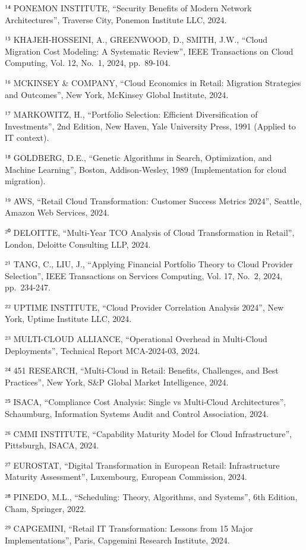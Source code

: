 \documentclass[12pt,a4paper,oneside]{book}
\numberwithin{figure}{chapter} %
\numberwithin{table}{chapter}  %
\begin{document}
¹⁴ PONEMON INSTITUTE, ``Security Benefits of Modern Network
Architectures'', Traverse City, Ponemon Institute LLC, 2024.

¹⁵ KHAJEH-HOSSEINI, A., GREENWOOD, D., SMITH, J.W., ``Cloud Migration
Cost Modeling: A Systematic Review'', IEEE Transactions on Cloud
Computing, Vol. 12, No.~1, 2024, pp.~89-104.

¹⁶ MCKINSEY \& COMPANY, ``Cloud Economics in Retail: Migration
Strategies and Outcomes'', New York, McKinsey Global Institute, 2024.

¹⁷ MARKOWITZ, H., ``Portfolio Selection: Efficient Diversification of
Investments'', 2nd Edition, New Haven, Yale University Press, 1991
(Applied to IT context).

¹⁸ GOLDBERG, D.E., ``Genetic Algorithms in Search, Optimization, and
Machine Learning'', Boston, Addison-Wesley, 1989 (Implementation for
cloud migration).

¹⁹ AWS, ``Retail Cloud Transformation: Customer Success Metrics 2024'',
Seattle, Amazon Web Services, 2024.

²⁰ DELOITTE, ``Multi-Year TCO Analysis of Cloud Transformation in
Retail'', London, Deloitte Consulting LLP, 2024.

²¹ TANG, C., LIU, J., ``Applying Financial Portfolio Theory to Cloud
Provider Selection'', IEEE Transactions on Services Computing, Vol. 17,
No.~2, 2024, pp.~234-247.

²² UPTIME INSTITUTE, ``Cloud Provider Correlation Analysis 2024'', New
York, Uptime Institute LLC, 2024.

²³ MULTI-CLOUD ALLIANCE, ``Operational Overhead in Multi-Cloud
Deployments'', Technical Report MCA-2024-03, 2024.

²⁴ 451 RESEARCH, ``Multi-Cloud in Retail: Benefits, Challenges, and Best
Practices'', New York, S\&P Global Market Intelligence, 2024.

²⁵ ISACA, ``Compliance Cost Analysis: Single vs Multi-Cloud
Architectures'', Schaumburg, Information Systems Audit and Control
Association, 2024.

²⁶ CMMI INSTITUTE, ``Capability Maturity Model for Cloud
Infrastructure'', Pittsburgh, ISACA, 2024.

²⁷ EUROSTAT, ``Digital Transformation in European Retail: Infrastructure
Maturity Assessment'', Luxembourg, European Commission, 2024.

²⁸ PINEDO, M.L., ``Scheduling: Theory, Algorithms, and Systems'', 6th
Edition, Cham, Springer, 2022.

²⁹ CAPGEMINI, ``Retail IT Transformation: Lessons from 15 Major
Implementations'', Paris, Capgemini Research Institute, 2024.
\end{document}
